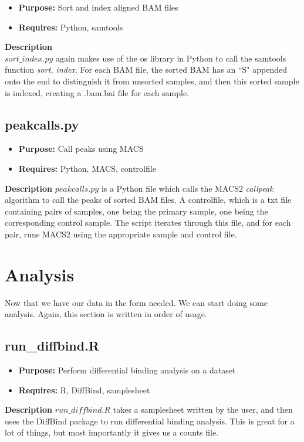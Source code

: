 \documentclass{amsart}
\begin{document}
    \begin{itemize}
        \item \textbf{Purpose: } Sort and index aligned BAM files
        \item \textbf{Requires: } Python, samtools 
    \end{itemize}
    \textbf{Description} \\
    $sort\_index.py$ again makes use of the os library in Python to call the samtools function \textit{sort, index}. For each BAM file, the sorted BAM has an ``S" appended onto the end to distinguish it from unsorted samples, and then this sorted sample is indexed, creating a .bam.bai file for each sample.

\subsection{peakcalls.py}

    \begin{itemize}
        \item \textbf{Purpose: } Call peaks using MACS    
        \item \textbf{Requires: } Python, MACS, controlfile 
    \end{itemize}
    \textbf{Description}
    $peakcalls.py$ is a Python file which calls the MACS2 \textit{callpeak} algorithm to call the peaks of sorted BAM files. A controlfile, which is a txt file containing pairs of samples, one being the primary sample, one being the corresponding control sample. The script iterates through this file, and for each pair, runs MACS2 using the appropriate sample and control file.   
    
\section{Analysis}

Now that we have our data in the form needed. We can start doing some analysis. Again, this section is written in order of usage.

\subsection{run\_diffbind.R}

    \begin{itemize}
        \item \textbf{Purpose: } Perform differential binding analysis on a dataset
        \item \textbf{Requires: } R, DiffBind, samplesheet
    \end{itemize}
    \textbf{Description}
    $run\_diffbind.R$ takes a samplesheet written by the user, and then uses the DiffBind package to run differential binding analysis. This is great for a lot of things, but most importantly it gives us a counts file.
\end{document}
